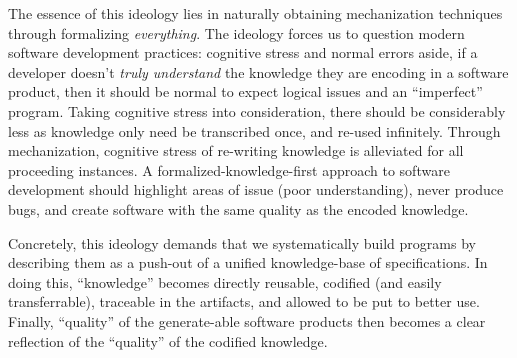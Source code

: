 The essence of this ideology lies in naturally obtaining mechanization
techniques through formalizing \textit{everything}. The ideology forces us to
question modern software development practices: cognitive stress and normal
errors aside, if a developer doesn't \textit{truly understand} the knowledge
they are encoding in a software product, then it should be normal to expect
logical issues and an ``imperfect'' program. Taking cognitive stress into
consideration, there should be considerably less as knowledge only need be
transcribed once, and re-used infinitely. Through mechanization, cognitive
stress of re-writing knowledge is alleviated for all proceeding instances. A
formalized-knowledge-first approach to software development should highlight
areas of issue (poor understanding), never produce bugs, and create software
with the same quality as the encoded knowledge.

Concretely, this ideology demands that we systematically build programs by
describing them as a push-out of a unified knowledge-base of specifications. In
doing this, ``knowledge'' becomes directly reusable, codified (and easily
transferrable), traceable in the artifacts, and allowed to be put to better use.
Finally, ``quality'' of the generate-able software products then becomes a clear
reflection of the ``quality'' of the codified knowledge.
